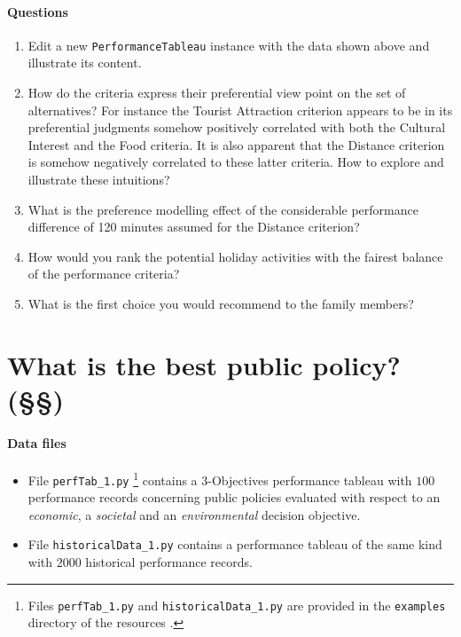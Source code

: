 \paragraph{\textbf{Questions}}

\begin{enumerate}
\item Edit a new \texttt{PerformanceTableau} instance with the data shown above and illustrate its content.
\item How do the criteria express their preferential view point on the set of alternatives? For instance the Tourist Attraction criterion appears to be in its preferential judgments somehow positively correlated with both the Cultural Interest and the Food criteria. It is also apparent that the Distance criterion is somehow negatively correlated to these latter criteria. How to explore and illustrate these intuitions?
\item What is the preference modelling effect of the considerable performance difference of 120 minutes assumed for the Distance criterion?
\item How would you rank the potential holiday activities with the fairest balance of the performance criteria?
\item What is the first choice you would recommend to the family members?
\end{enumerate}

\section{What is the best public policy? (§§)}
\label{sec:15.5}

\paragraph{\textbf{Data files}}

\begin{itemize}
\item File \texttt{perfTab\_1.py} \footnote{Files \texttt{perfTab\_1.py} and \texttt{historicalData\_1.py} are provided in the \texttt{examples} directory of the \Digraph resources \citep{BIS-2021b}.} contains a 3-Objectives performance tableau with $100$ performance records concerning public policies evaluated with respect to an \emph{economic}, a \emph{societal} and an \emph{environmental} decision objective.
\item File \texttt{historicalData\_1.py} contains a performance tableau of the same kind with $2000$ historical performance records.
\end{itemize}

